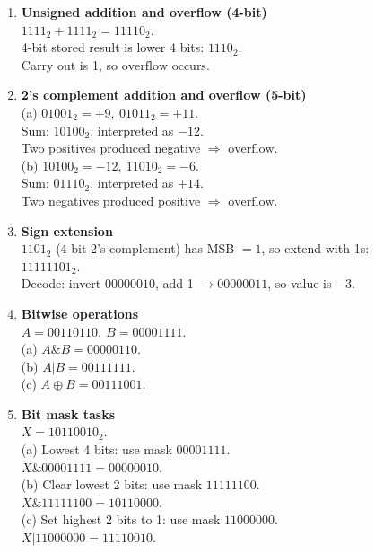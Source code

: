 \documentclass[11pt]{article}
\begin{document}
\begin{enumerate}[label=\textbf{B\arabic*.}]
  \item \textbf{Unsigned addition and overflow (4-bit)}\\
  \(1111_2+1111_2=11110_2\).\\
  4-bit stored result is lower 4 bits: \(\boxed{1110_2}\).\\
  Carry out is 1, so \(\boxed{\text{overflow occurs}}\).

  \item \textbf{2's complement addition and overflow (5-bit)}\\
  (a) \(01001_2=+9,\ 01011_2=+11\).\\
  Sum: \(10100_2\), interpreted as \(-12\).\\
  Two positives produced negative \(\Rightarrow\) \(\boxed{\text{overflow}}\).\\
  (b) \(10100_2=-12,\ 11010_2=-6\).\\
  Sum: \(01110_2\), interpreted as \(+14\).\\
  Two negatives produced positive \(\Rightarrow\) \(\boxed{\text{overflow}}\).

  \item \textbf{Sign extension}\\
  \(1101_2\) (4-bit 2's complement) has MSB \(=1\), so extend with 1s:\\
  \(11111101_2\).\\
  Decode: invert \(00000010\), add 1 \(\to 00000011\), so value is \(\boxed{-3}\).

  \item \textbf{Bitwise operations}\\
  \(A=00110110,\ B=00001111\).\\
  (a) \(A\&B = 00000110\).\\
  (b) \(A|B = 00111111\).\\
  (c) \(A\oplus B = 00111001\).

  \item \textbf{Bit mask tasks}\\
  \(X=10110010_2\).\\
  (a) Lowest 4 bits: use mask \(00001111\).\\
  \(X\&00001111 = 00000010\).\\
  (b) Clear lowest 2 bits: use mask \(11111100\).\\
  \(X\&11111100 = 10110000\).\\
  (c) Set highest 2 bits to 1: use mask \(11000000\).\\
  \(X|11000000 = 11110010\).


\end{enumerate}
\end{document}

